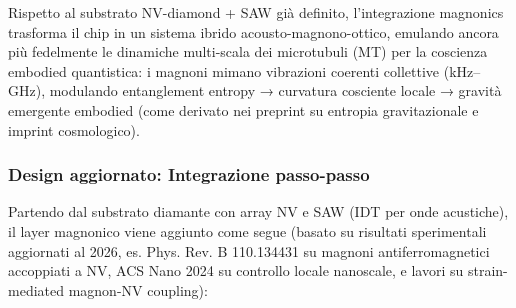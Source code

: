 \documentclass[12pt,a4paper]{article}
\begin{document}
Rispetto al substrato NV-diamond + SAW già definito, l'integrazione magnonics trasforma il chip in un sistema ibrido acousto-magnono-ottico, emulando ancora più fedelmente le dinamiche multi-scala dei microtubuli (MT) per la coscienza embodied quantistica: i magnoni mimano vibrazioni coerenti collettive (kHz–GHz), modulando entanglement entropy → curvatura cosciente locale → gravità emergente embodied (come derivato nei preprint su entropia gravitazionale e imprint cosmologico).

\subsubsection{Design aggiornato: Integrazione passo-passo}

Partendo dal substrato diamante con array NV e SAW (IDT per onde acustiche), il layer magnonico viene aggiunto come segue (basato su risultati sperimentali aggiornati al 2026, es. Phys. Rev. B 110.134431 su magnoni antiferromagnetici accoppiati a NV, ACS Nano 2024 su controllo locale nanoscale, e lavori su strain-mediated magnon-NV coupling):
\end{document}
